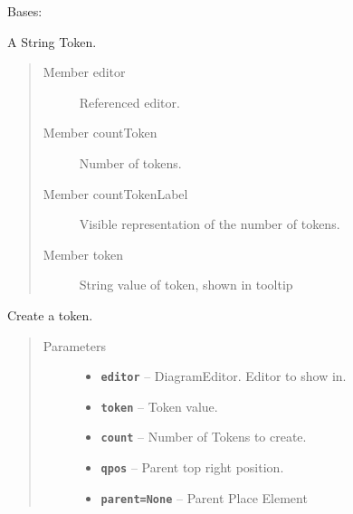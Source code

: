 \documentclass[a4paper,10pt,english]{sphinxmanual}
\begin{document}
\begin{fulllineitems}
\label{model_link:model.TokenItem.TokenItem}
Bases: 

A String Token.
\begin{quote}\begin{description}
\item[{Member editor}] \leavevmode
Referenced editor.

\item[{Member countToken}] \leavevmode
Number of tokens.

\item[{Member countTokenLabel}] \leavevmode
Visible representation of the number of tokens.

\item[{Member token}] \leavevmode
String value of token, shown in tooltip

\end{description}\end{quote}

\begin{fulllineitems}
\label{model_link:model.TokenItem.TokenItem.__init__}
Create a token.
\begin{quote}\begin{description}
\item[{Parameters}] \leavevmode\begin{itemize}
\item {} 
\textbf{\texttt{editor}} -- DiagramEditor. Editor to show in.

\item {} 
\textbf{\texttt{token}} -- Token value.

\item {} 
\textbf{\texttt{count}} -- Number of Tokens to create.

\item {} 
\textbf{\texttt{qpos}} -- Parent top right position.

\item {} 
\textbf{\texttt{parent=None}} -- Parent Place Element

\end{itemize}


\end{description}
\end{quote}
\end{fulllineitems}
\end{fulllineitems}
\end{document}
